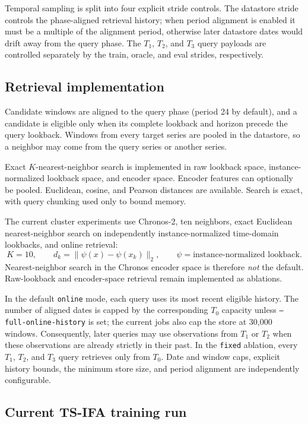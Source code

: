 \documentclass[11pt]{article}
\newcommand{\method}[1]{\texttt{#1}}
\begin{document}
Temporal sampling is split into four explicit stride controls.  The datastore
stride controls the phase-aligned retrieval history; when period alignment is
enabled it must be a multiple of the alignment period, otherwise later
datastore dates would drift away from the query phase.  The $T_1$, $T_2$, and
$T_3$ query payloads are controlled separately by the train, oracle, and eval
strides, respectively.

\subsection{Retrieval implementation}

Candidate windows are aligned to the query phase (period 24 by default), and a
candidate is eligible only when its complete lookback and horizon precede the
query lookback.  Windows from every target series are pooled in the datastore,
so a neighbor may come from the query series or another series.

Exact $K$-nearest-neighbor search is implemented in raw lookback space,
instance-normalized lookback space, and encoder space.  Encoder features can
optionally be pooled.  Euclidean, cosine, and Pearson distances are available.
Search is exact, with query chunking used only to bound memory.

The current cluster experiments use Chronos-2, ten neighbors, exact Euclidean
nearest-neighbor search on independently instance-normalized time-domain
lookbacks, and online retrieval:
\[
  K=10,\qquad d_k=\lVert\psi(x)-\psi(x_k)\rVert_2,
  \qquad \psi=\text{instance-normalized lookback}.
\]
Nearest-neighbor search in the Chronos encoder space is therefore
\emph{not} the default.  Raw-lookback and encoder-space retrieval remain
implemented as ablations.

In the default \method{online} mode, each query uses its most recent eligible
history.  The number of aligned dates is capped by the corresponding $T_0$
capacity unless \method{--full-online-history} is set; the current jobs also cap
the store at 30,000 windows.  Consequently, later queries may use observations
from $T_1$ or $T_2$ when these observations are already strictly in their past.
In the \method{fixed} ablation, every $T_1$, $T_2$, and $T_3$ query retrieves
only from $T_0$.  Date and window caps, explicit history bounds, the minimum
store size, and period alignment are independently configurable.

\subsection{Current TS-IFA training run}
\end{document}
